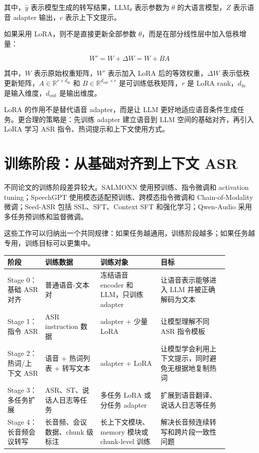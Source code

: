\documentclass[UTF8,fontset=fandol]{ctexart}
\begin{document}
其中，$\hat{y}$ 表示模型生成的转写结果，$\mathrm{LLM}_{\theta}$ 表示参数为 $\theta$ 的大语言模型，$Z$ 表示语音 adapter 输出，$c$ 表示上下文提示。

如果采用 LoRA，则不是直接更新全部参数 $\theta$，而是在部分线性层中加入低秩增量：

$$
W' = W + \Delta W = W + BA
$$

其中，$W$ 表示原始权重矩阵，$W'$ 表示加入 LoRA 后的等效权重，$\Delta W$ 表示低秩更新矩阵，$A \in \mathbb{R}^{r \times d_{\text{in}}}$ 和 $B \in \mathbb{R}^{d_{\text{out}} \times r}$ 是可训练低秩矩阵，$r$ 是 LoRA rank，$d_{\text{in}}$ 是输入维度，$d_{\text{out}}$ 是输出维度。

LoRA 的作用不是替代语音 adapter，而是让 LLM 更好地适应语音条件生成任务。更合理的策略是：先训练 adapter 建立语音到 LLM 空间的基础对齐，再引入 LoRA 学习 ASR 指令、热词提示和上下文使用方式。

\section{训练阶段：从基础对齐到上下文 ASR}

不同论文的训练阶段差异较大。SALMONN 使用预训练、指令微调和 activation tuning；SpeechGPT 使用模态适配预训练、跨模态指令微调和 Chain-of-Modality 微调；Seed-ASR 包括 SSL、SFT、Context SFT 和强化学习；Qwen-Audio 采用多任务预训练和监督微调。

这些工作可以归纳出一个共同规律：如果任务越通用，训练阶段越多；如果任务越专用，训练目标可以更集中。

\begin{longtable}{p{0.15\linewidth}p{0.22\linewidth}p{0.24\linewidth}p{0.27\linewidth}}
\toprule
阶段 & 训练数据 & 训练对象 & 目标 \\
\midrule
Stage 0：基础 ASR 对齐 & 普通语音-文本对 & 冻结语音 encoder 和 LLM，只训练 adapter & 让语音表示能够进入 LLM 并被正确解码为文本 \\
\midrule
Stage 1：指令 ASR & ASR instruction 数据 & adapter + 少量 LoRA & 让模型理解不同 ASR 指令模板 \\
\midrule
Stage 2：热词/上下文 ASR & 语音 + 热词列表 + 转写文本 & adapter + LoRA & 让模型学会利用上下文提示，同时避免无根据地复制热词 \\
\midrule
Stage 3：多任务扩展 & ASR、ST、说话人日志等任务 & 多任务 LoRA 或分任务 adapter & 扩展到语音翻译、说话人日志等任务 \\
\midrule
Stage 4：长音频会议转写 & 长音频、会议数据、chunk 级标注 & 长上下文模块、memory 模块或 chunk-level 训练 & 解决长音频连续转写和跨片段一致性问题 \\
\bottomrule
\end{longtable}
\end{document}
